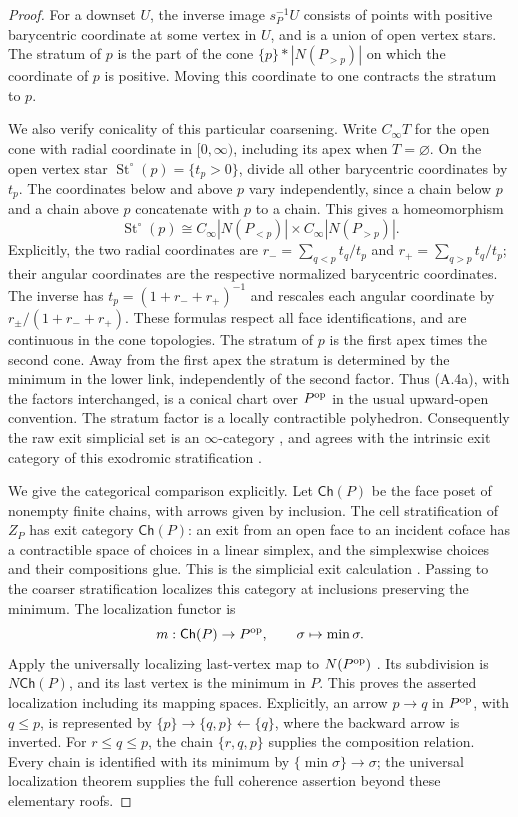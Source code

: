 \begin{proof}
For a downset $U$, the inverse image $s_P^{-1}U$ consists of points with
positive barycentric coordinate at some vertex in $U$, and is a union of
open vertex stars. The stratum of $p$ is the part of the cone
$\{p\}*|N(P_{>p})|$ on which the coordinate of $p$ is positive.
Moving this coordinate to one contracts the stratum to $p$.

We also verify conicality of this particular coarsening. Write
$C_\infty T$ for the open cone with radial coordinate in $[0,\infty)$,
including its apex when $T=\varnothing$. On the open vertex star
$\operatorname{St}^{\circ}(p)=\{t_p>0\}$, divide all other barycentric
coordinates by $t_p$. The coordinates below and above $p$ vary
independently, since a chain below $p$ and a chain above $p$ concatenate
with $p$ to a chain. This gives a homeomorphism
\[
 \operatorname{St}^{\circ}(p)
 \cong C_\infty|N(P_{<p})|\times C_\infty|N(P_{>p})|.
\tag{A.4a}
\]
Explicitly, the two radial coordinates are
$r_-=\sum_{q<p}t_q/t_p$ and $r_+=\sum_{q>p}t_q/t_p$; their angular
coordinates are the respective normalized barycentric coordinates.
The inverse has $t_p=(1+r_-+r_+)^{-1}$ and rescales each angular
coordinate by $r_\pm/(1+r_-+r_+)$. These formulas respect all face
identifications, and are continuous in the cone topologies. The stratum
of $p$ is the first apex times the second cone. Away from the first
apex the stratum is determined by the minimum in the lower link,
independently of the second factor. Thus (A.4a), with the factors
interchanged, is a conical chart over $P^{\mathrm{op}}$ in the usual upward-open
convention. The stratum factor is a locally contractible polyhedron.
Consequently the raw exit simplicial set is an $\infty$-category
\citep[Theorem A.6.4]{LurieHA}, and agrees with the intrinsic exit
category of this exodromic stratification
\citep[Recollection 5.6.1]{HPT2026}.

We give the categorical comparison explicitly. Let $\mathsf{Ch}(P)$ be
the face poset of nonempty finite chains, with arrows given by inclusion.
The cell stratification of $Z_P$ has exit category $\mathsf{Ch}(P)$:
an exit from an open face to an incident coface has a contractible space
of choices in a linear simplex, and the simplexwise choices and their
compositions glue. This is the simplicial exit calculation
\citep[Theorem A.6.10]{LurieHA}. Passing to the coarser stratification
localizes this category at inclusions preserving the minimum. The
localization functor is
\[
 m:\mathsf{Ch}(P)\to P^{\mathrm{op}},\qquad \sigma\mapsto\min\sigma.
\]
Apply the universally localizing last-vertex map to $N(P^{\mathrm{op}})$
\citep[Proposition 6.3.6.2]{KerodonSubdivision}. Its subdivision is
$N\mathsf{Ch}(P)$, and its last vertex is the minimum in $P$.
This proves the asserted localization including its mapping spaces.
Explicitly, an arrow $p\to q$ in $P^{\mathrm{op}}$, with $q\leq p$, is represented by
$\{p\}\to\{q,p\}\leftarrow\{q\}$, where the backward arrow is inverted.
For $r\leq q\leq p$, the chain $\{r,q,p\}$ supplies the composition
relation.
Every chain is identified with its minimum by
$\{\min\sigma\}\to\sigma$; the universal localization theorem supplies
the full coherence assertion beyond these elementary roofs.


\end{proof}
